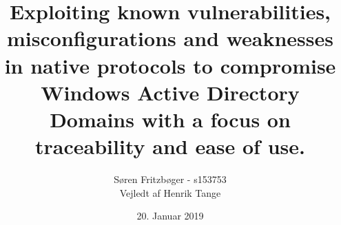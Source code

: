 
\usepackage{minted}



\usepackage{fancyhdr}
\usepackage{lastpage}

\pagestyle{fancy}
\fancyhf{}

\title{\LARGE Exploiting known vulnerabilities, misconfigurations and weaknesses in native protocols to compromise Windows Active Directory Domains with a focus on traceability and ease of use.}
\author{Søren Fritzbøger - s153753\\
Vejledt af Henrik Tange\\
}
\date{20. Januar 2019}



\gdef\BackMatter{
  \cleardoublepage
  \printbibliography[heading=bibintoc]
}



\usepackage{csquotes}
\usepackage[english]{babel}

\addto\captionsenglish{%
  \renewcommand{\contentsname}%
    {Table of contents}%
}

\addto\captionsdanish{%
  \renewcommand{\contentsname}%
    {Indholdsfortegnelse}%
}

